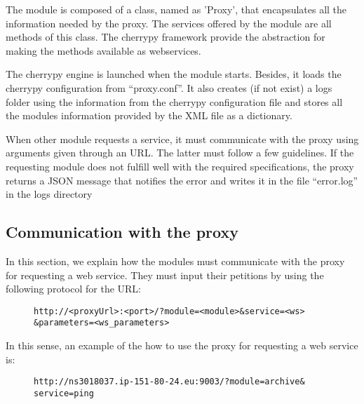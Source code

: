 The module is composed of a class, named as 'Proxy', that encapsulates all the information needed by the proxy. The services offered by the module are all methods of this class. The cherrypy framework provide the abstraction for making the methods available as webservices. 

The cherrypy engine is launched when the module starts. Besides, it loads the cherrypy configuration from “proxy.conf”. It also creates (if not exist) a logs folder using the information from the cherrypy configuration file and stores all the modules information provided by the XML file as a dictionary.

When other module requests a service, it must communicate with the proxy using arguments given through an URL. The latter must follow a few guidelines. If the requesting module does not fulfill well with the required specifications, the proxy returns a JSON message that notifies the error and writes it in the file “error.log” in the logs directory

\subsection{Communication with the proxy}

In this section, we explain how the modules must communicate with the proxy for requesting a web service. They must input their petitions by using the following protocol for the URL:
\begin{figure}[!ht]
\centering
\begin{verbatim}
http://<proxyUrl>:<port>/?module=<module>&service=<ws>
&parameters=<ws_parameters>
\end{verbatim}
\label{fi:url_protocol}
\end{figure}

In this sense, an example of the how to use the proxy for requesting a web service is:

\begin{figure}[!ht]
\centering
\begin{verbatim}
http://ns3018037.ip-151-80-24.eu:9003/?module=archive&
service=ping
\end{verbatim}
\label{fi:url_ping_example}
\end{figure}

